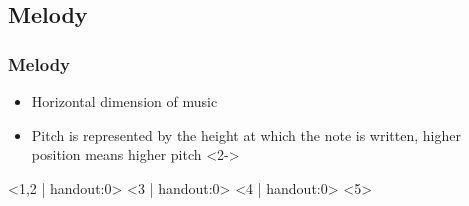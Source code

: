 \documentclass[english,fragile]{beamer}
\begin{document}
\subsection{Melody}
	\begin{frame}
		\frametitle{Melody}
		\begin{itemize}
			\item \alert{Horizontal} dimension of music
			\item \alert{Pitch} is represented by the \alert{height} at which the note is written, higher position means higher pitch
			<2->
		\end{itemize}
		\begin{center}
			<1,2 | handout:0>
			<3 | handout:0>
			<4 | handout:0>
			<5>
			\vfill
			\href{file:///home/trigork/presentation/midi/intro_scale.mp3}{}
		\end{center}
\end{frame}
\end{document}
